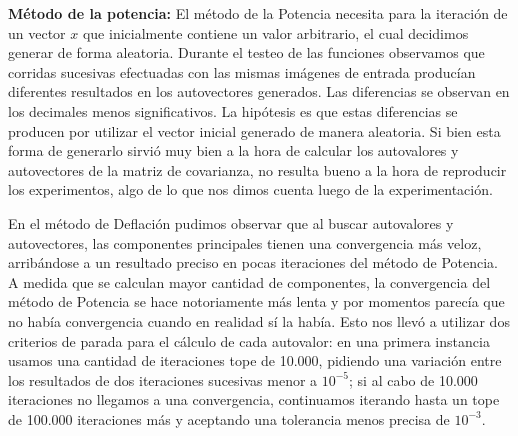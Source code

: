 \textbf{Método de la potencia:} El método de la Potencia necesita para la iteración de un vector $x$ que inicialmente contiene un valor arbitrario, el cual decidimos generar de forma aleatoria. Durante el testeo de las funciones observamos que corridas sucesivas efectuadas con las mismas imágenes de entrada producían diferentes resultados en los autovectores generados. Las diferencias se observan en los decimales menos significativos. La hipótesis es que estas diferencias se producen por utilizar el vector inicial generado de manera aleatoria. Si bien esta forma de generarlo sirvió muy bien a la hora de calcular los autovalores y autovectores de la matriz de covarianza, no resulta bueno a la hora de reproducir los experimentos, algo de lo que nos dimos cuenta luego de la experimentación.
\par En el método de Deflación pudimos observar que al buscar autovalores y autovectores, las componentes principales tienen una convergencia más veloz, arribándose a un resultado preciso en pocas iteraciones del método de Potencia. A medida que se calculan mayor cantidad de componentes, la convergencia del método de Potencia se hace notoriamente más lenta y por momentos parecía que no había convergencia cuando en realidad sí la había. Esto nos llevó a utilizar dos criterios de parada para el cálculo de cada autovalor: en una primera instancia usamos una cantidad de iteraciones tope de 10.000, pidiendo una variación entre los resultados de dos iteraciones sucesivas menor a $10^{-5}$; si al cabo de 10.000 iteraciones no llegamos a una convergencia, continuamos iterando hasta un tope de 100.000 iteraciones más y aceptando una tolerancia menos precisa de $10^{-3}$.


